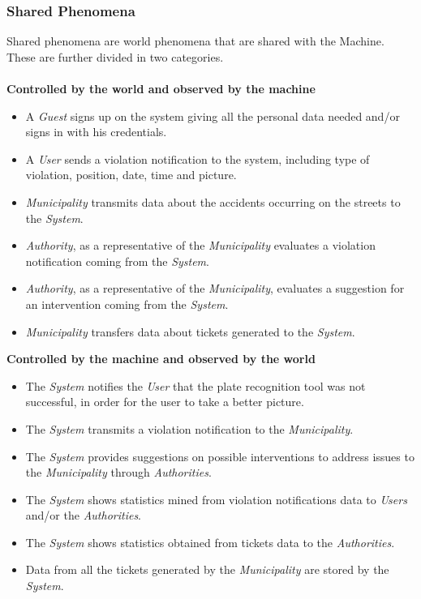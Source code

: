 \documentclass {article}
\begin{document}
		\subsubsection{Shared Phenomena}
		Shared phenomena are world phenomena that are shared with the Machine. These are further divided in two categories.\\ \\
		{\bf Controlled by the world and observed by the machine}
		\begin{itemize}
			\item A {\it Guest} signs up on the system giving all the personal data needed and/or signs in with his credentials.
			\item A {\it User} sends a violation notification to the system, including type of violation, position, date, time and picture.
			\item {\it Municipality} transmits data about the accidents occurring on the streets to the {\it System}.
			\item {\it Authority}, as a representative of the {\it Municipality} evaluates a violation notification coming from the {\it System}. 
			\item {\it Authority}, as a representative of the {\it Municipality}, evaluates a suggestion for an intervention coming from the {\it System}. 
			\item {\it Municipality} transfers data about tickets generated to the {\it System}.
		\end{itemize} 
		{\bf Controlled by the machine and observed by the world}
		\begin{itemize}
			\item The {\it System} notifies the {\it User} that the plate recognition tool was not successful, in order for the user to take a better picture.
			\item The {\it System} transmits a violation notification to the {\it Municipality}.
			\item The {\it System} provides suggestions on possible interventions to address issues to the {\it Municipality} through {\it Authorities}.
			\item The {\it System} shows statistics mined from violation notifications data to {\it Users} and/or the {\it Authorities}.
			\item The {\it System} shows statistics obtained from tickets data to the {\it Authorities}.
			\item Data from all the tickets generated by the {\it Municipality} are stored by the {\it System}.
		\end{itemize}	
\end{document}
